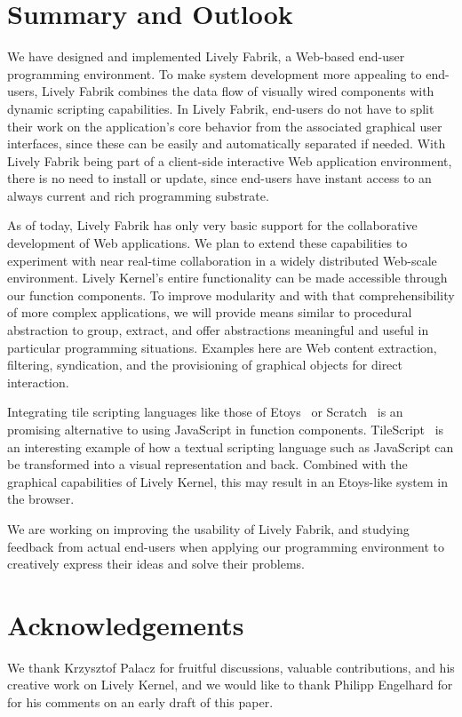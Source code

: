 \documentclass[pdftex, times, 10pt, twocolumn]{article}
\begin{document}
\section{Summary and Outlook}
We have designed and implemented Lively Fabrik, a Web-based end-user programming environment. To make system development more appealing to end-users, Lively Fabrik combines the data flow of visually wired components with dynamic scripting capabilities. In Lively Fabrik, end-users do not have to split their work on the application's core behavior from the associated graphical user interfaces, since these can be easily and automatically separated if needed. With Lively Fabrik being part of a client-side interactive Web application environment, there is no need to install or update, since end-users have instant access to an always current and rich programming substrate. 

As of today, Lively Fabrik has only very basic support for the collaborative development of Web applications. We plan to extend these capabilities to experiment with near real-time collaboration in a widely distributed Web-scale environment. Lively Kernel's entire functionality can be made accessible through our function components. To improve modularity and with that comprehensibility of more complex applications, we will provide means similar to procedural abstraction to group, extract, and offer abstractions meaningful and useful in particular programming situations. Examples here are Web content extraction, filtering, syndication, and the provisioning of graphical objects for direct interaction. 

Integrating tile scripting languages like those of Etoys~\cite{Kay2005SEA} or Scratch~\cite{Maloney2004SSP} is an promising alternative to using JavaScript in function components. TileScript~\cite{Warth2008TMS} is an interesting example of how a textual scripting language such as JavaScript can be transformed into a visual representation and back. Combined with the graphical capabilities of Lively Kernel, this may result in an Etoys-like system in the browser. 

We are working on improving the usability of Lively Fabrik, and studying feedback from actual end-users when applying our programming environment to creatively express their ideas and solve their problems. 



\section{Acknowledgements}
We thank Krzysztof Palacz for fruitful discussions, valuable contributions, and his creative work on Lively Kernel, and we would like to thank Philipp Engelhard for for his comments on an early draft of this paper.  

 



 
\end{document}
